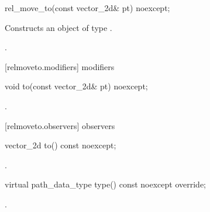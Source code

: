 \begin{itemdecl}
    rel_move_to(const vector_2d& pt) noexcept;
\end{itemdecl}
\begin{itemdescr}
	\pnum
	\effects
	Constructs an object of type .
	
	\pnum
	\postconditions
	.
\end{itemdescr}

 [relmoveto.modifiers]{ modifiers}

\begin{itemdecl}
    void to(const vector_2d& pt) noexcept;
\end{itemdecl}
\begin{itemdescr}
	\pnum
	\postconditions
	.
	
\end{itemdescr}

 [relmoveto.observers]{ observers}

\begin{itemdecl}
    vector_2d to() const noexcept;
\end{itemdecl}
\begin{itemdescr}
	\pnum
	\returns
	.

\end{itemdescr}

\begin{itemdecl}
    virtual path_data_type type() const noexcept override;
\end{itemdecl}
\begin{itemdescr}
	\pnum
	\returns
	.

\end{itemdescr}
